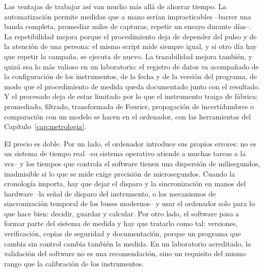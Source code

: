 
Las ventajas de trabajar así van mucho más allá de ahorrar tiempo. La automatización permite medidas que a mano serían impracticables --barrer una banda completa, promediar miles de capturas, repetir un ensayo durante días--. La repetibilidad mejora porque el procedimiento deja de depender del pulso y de la atención de una persona: el mismo script mide siempre igual, y si otro día hay que repetir la campaña, se ejecuta de nuevo. La trazabilidad mejora también, y quizá sea lo más valioso en un laboratorio: el registro de datos va acompañado de la configuración de los instrumentos, de la fecha y de la versión del programa, de modo que el procedimiento de medida queda documentado junto con el resultado. Y el procesado deja de estar limitado por lo que el instrumento traiga de fábrica: promediado, filtrado, transformada de Fourier, propagación de incertidumbres o comparación con un modelo se hacen en el ordenador, con las herramientas del Capítulo~\ref{cap:metrologia}.

El precio es doble. Por un lado, el ordenador introduce sus propios errores: no es un sistema de tiempo real --su sistema operativo atiende a muchas tareas a la vez-- y los tiempos que controla el software tienen una dispersión de milisegundos, inadmisible si lo que se mide exige precisión de microsegundos. Cuando la cronología importa, hay que dejar el disparo y la sincronización en manos del hardware --la señal de disparo del instrumento, o los mecanismos de sincronización temporal de los buses modernos-- y usar el ordenador solo para lo que hace bien: decidir, guardar y calcular. Por otro lado, el software pasa a formar parte del sistema de medida y hay que tratarlo como tal: versiones, verificación, copias de seguridad y documentación, porque un programa que cambia sin control cambia también la medida. En un laboratorio acreditado, la validación del software no es una recomendación, sino un requisito del mismo rango que la calibración de los instrumentos.


